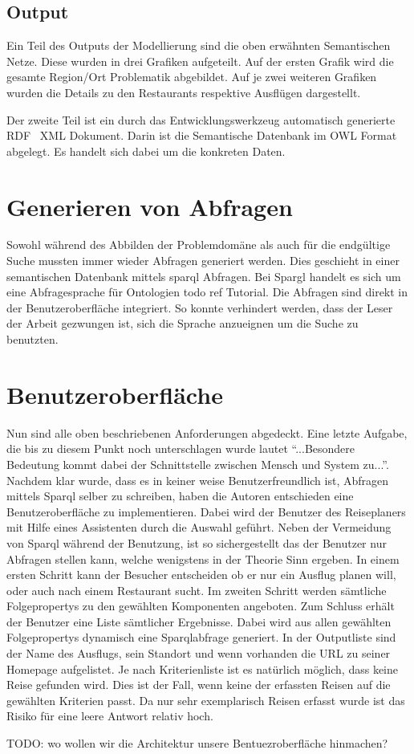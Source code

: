 \subsection{Output}
\label{subsec:loesung_modellierung_output}
Ein Teil des Outputs der Modellierung sind die oben erwähnten Semantischen Netze. Diese wurden in drei Grafiken aufgeteilt. Auf der ersten Grafik wird die gesamte Region/Ort Problematik abgebildet. Auf je zwei weiteren Grafiken wurden die Details zu den Restaurants respektive Ausflügen dargestellt.

Der zweite Teil ist ein durch das Entwicklungswerkzeug automatisch generierte RDF \ XML Dokument. Darin ist die Semantische Datenbank im OWL Format abgelegt. Es handelt sich dabei um die konkreten Daten.

\section{Generieren von Abfragen}
\label{sec:loesung_sparql}

Sowohl während des Abbilden der Problemdomäne als auch für die endgültige Suche mussten immer wieder Abfragen generiert werden. Dies geschieht in einer semantischen Datenbank mittels sparql Abfragen. Bei Spargl handelt es sich um eine  Abfragesprache für Ontologien todo ref Tutorial. Die Abfragen sind direkt in der Benutzeroberfläche integriert. So konnte verhindert werden, dass der Leser der Arbeit gezwungen ist, sich die Sprache anzueignen um die Suche zu benutzten.


\section{Benutzeroberfläche}
\label{sec:gui}

Nun sind alle oben beschriebenen Anforderungen abgedeckt. Eine letzte Aufgabe, die bis zu diesem Punkt noch unterschlagen wurde lautet "`...Besondere Bedeutung kommt dabei der Schnittstelle zwischen Mensch und System zu..."'. Nachdem klar wurde, dass es in keiner weise Benutzerfreundlich ist, Abfragen mittels Sparql selber zu schreiben, haben die Autoren entschieden eine Benutzeroberfläche zu implementieren. Dabei wird der Benutzer des Reiseplaners mit Hilfe eines Assistenten durch die Auswahl geführt. Neben der Vermeidung von Sparql während der Benutzung, ist so sichergestellt das der Benutzer nur Abfragen stellen kann, welche wenigstens in der Theorie Sinn ergeben. 
In einem ersten Schritt kann der Besucher entscheiden ob er nur ein Ausflug planen will, oder auch nach einem Restaurant sucht. Im zweiten Schritt werden sämtliche Folgepropertys zu den gewählten Komponenten angeboten. Zum Schluss erhält der Benutzer eine Liste sämtlicher Ergebnisse. Dabei wird aus allen gewählten Folgepropertys dynamisch eine Sparqlabfrage generiert. In der Outputliste sind der Name des Ausflugs, sein Standort und wenn vorhanden die URL zu seiner Homepage aufgelistet. Je nach Kriterienliste ist es natürlich möglich, dass keine Reise gefunden wird. Dies ist der Fall, wenn keine der erfassten Reisen auf die gewählten Kriterien passt. Da nur sehr exemplarisch Reisen erfasst wurde ist das Risiko für eine leere Antwort relativ hoch.

TODO: wo wollen wir die Architektur unsere Bentuezroberfläche hinmachen?

